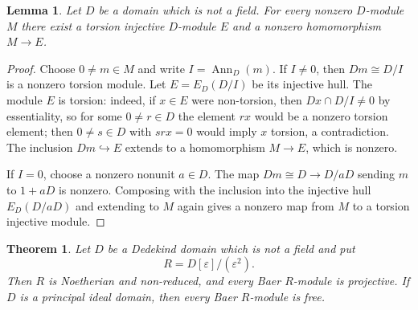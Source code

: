 \documentclass[11pt]{article}
\newtheorem{theorem}{Theorem}[section]
\newtheorem{lemma}[lemma]{Lemma}
\theoremstyle{definition}
\theoremstyle{remark}
\newcommand{\Ann}{\operatorname{Ann}}
\begin{document}
\begin{lemma}\label{lem:torsion-injective-detects}
Let $D$ be a domain which is not a field.  For every nonzero $D$-module $M$
there exist a torsion injective $D$-module $E$ and a nonzero homomorphism
$M\to E$.
\end{lemma}

\begin{proof}
Choose $0\neq m\in M$ and write $I=\Ann_D(m)$.  If $I\neq0$, then
$Dm\cong D/I$ is a nonzero torsion module.  Let $E=E_D(D/I)$ be its injective
hull.  The module $E$ is torsion: indeed, if $x\in E$ were non-torsion, then
$Dx\cap D/I\neq0$ by essentiality, so for some $0\neq r\in D$ the element
$rx$ would be a nonzero torsion element; then $0\neq s\in D$ with
$srx=0$ would imply $x$ torsion, a contradiction.  The inclusion
$Dm\hookrightarrow E$ extends to a homomorphism $M\to E$, which is nonzero.

If $I=0$, choose a nonzero nonunit $a\in D$.  The map
$Dm\cong D\to D/aD$ sending $m$ to $1+aD$ is nonzero.  Composing with the
inclusion into the injective hull $E_D(D/aD)$ and extending to $M$ again gives
a nonzero map from $M$ to a torsion injective module.
\end{proof}

\begin{theorem}\label{thm:Dedekinddual}
Let $D$ be a Dedekind domain which is not a field and put
\[
 R=D[\varepsilon]/(\varepsilon^2).
\]
Then $R$ is Noetherian and non-reduced, and every Baer $R$-module is
projective.  If $D$ is a principal ideal domain, then every Baer $R$-module is
free.
\end{theorem}
\end{document}
